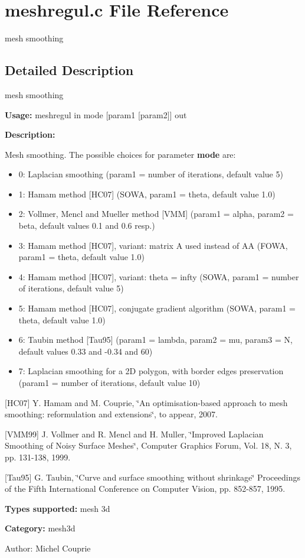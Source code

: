 \section{meshregul.c File Reference}
\label{meshregul_8c}
mesh smoothing 



\subsection{Detailed Description}
mesh smoothing 

{\bf Usage:} meshregul in mode [param1 [param2]] out

{\bf Description:}

Mesh smoothing. The possible choices for parameter {\bf mode} are: \begin{itemize}
\item 0: Laplacian smoothing (param1 = number of iterations, default value 5) \item 1: Hamam method [HC07] (SOWA, param1 = theta, default value 1.0) \item 2: Vollmer, Mencl and Mueller method [VMM] (param1 = alpha, param2 = beta, default values 0.1 and 0.6 resp.) \item 3: Hamam method [HC07], variant: matrix A used instead of AA (FOWA, param1 = theta, default value 1.0) \item 4: Hamam method [HC07], variant: theta = infty (SOWA, param1 = number of iterations, default value 5) \item 5: Hamam method [HC07], conjugate gradient algorithm (SOWA, param1 = theta, default value 1.0) \item 6: Taubin method [Tau95] (param1 = lambda, param2 = mu, param3 = N, default values 0.33 and -0.34 and 60) \item 7: Laplacian smoothing for a 2D polygon, with border edges preservation (param1 = number of iterations, default value 10)\end{itemize}
[HC07] Y. Hamam and M. Couprie, \char`\"{}An optimisation-based approach to mesh smoothing: reformulation and extensions\char`\"{}, to appear, 2007.

[VMM99] J. Vollmer and R. Mencl and H. Muller, \char`\"{}Improved Laplacian Smoothing of Noisy Surface Meshes\char`\"{}, Computer Graphics Forum, Vol. 18, N. 3, pp. 131-138, 1999.

[Tau95] G. Taubin, \char`\"{}Curve and surface smoothing without shrinkage\char`\"{} Proceedings of the Fifth International Conference on Computer Vision, pp. 852-857, 1995.

{\bf Types supported:} mesh 3d

{\bf Category:} mesh3d

\begin{Desc}
\item[Author:]Michel Couprie \end{Desc}
